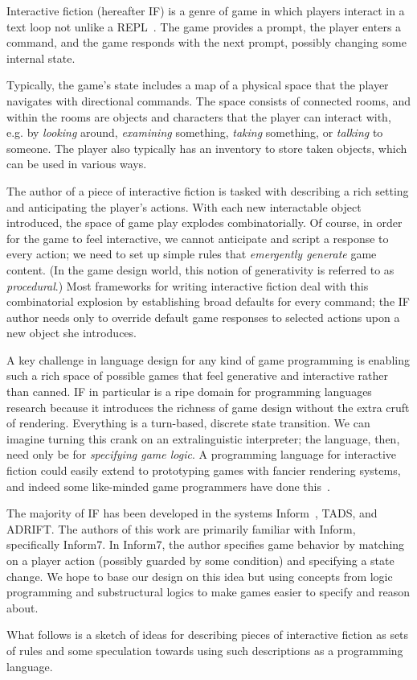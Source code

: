 Interactive fiction (hereafter IF) is a genre of game in which players
interact in a text loop not unlike a
REPL~\cite{Montfort:2004:TLP:940352}. The game provides a prompt, the
player enters a command, and the game responds with the next prompt,
possibly changing some internal state.

Typically, the game's state includes a map of a physical space that the
player navigates with directional commands. The space consists of connected
rooms, and within the rooms are objects and characters that the player can
interact with, e.g. by {\em looking} around, {\em examining} something, 
{\em taking} something, or {\em talking} to someone. The player also
typically has an inventory to store taken objects, which can be used in
various ways.

The author of a piece of interactive fiction is tasked with describing a
rich setting and anticipating the player's actions.  With each new
interactable object introduced, the space of game play explodes
combinatorially. Of course, in order for the game to feel interactive, we
cannot anticipate and script a response to every action; we need to set up
simple rules that {\em emergently generate} game content.  (In the game
design world, this notion of generativity is referred to as {\em
procedural}.) Most frameworks for writing interactive fiction deal with this
combinatorial explosion by establishing broad defaults for every command;
the IF author needs only to override default game responses to selected
actions upon a new object she introduces.

A key challenge in language design for any kind of game programming is
enabling such a rich space of possible games that feel generative and
interactive rather than canned.  IF in particular is a ripe domain for
programming languages research because it introduces the richness of game
design without the extra cruft of rendering. Everything is a turn-based,
discrete state transition. We can imagine turning this crank on an
extralinguistic interpreter; the language, then, need only be for {\em
specifying game logic}. A programming language for interactive fiction could
easily extend to prototyping games with fancier rendering systems, and
indeed some like-minded game programmers have done
this~\cite{smith-mine-ore-2009}.

The majority of IF has been developed in the systems
Inform~\cite{Nelson2005}, TADS, and ADRIFT. The authors of this work are
primarily familiar with Inform, specifically Inform7. In Inform7, the author
specifies game behavior by matching on a player action (possibly guarded by
some condition) and specifying a state change. We hope to base our design on
this idea but using concepts from logic programming and substructural logics
to make games easier to specify and reason about.

What follows is a sketch of ideas for describing pieces of interactive
fiction as sets of rules and some speculation towards using such
descriptions as a programming language.

